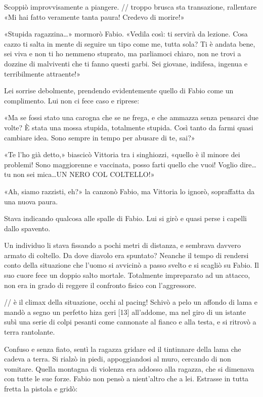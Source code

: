 Scoppiò improvvisamente a piangere.
// troppo brusca sta transazione, rallentare
«Mi hai fatto veramente tanta paura! Credevo di morire!»

«Stupida ragazzina\ldots» mormorò Fabio. «Vedila così: ti servirà da lezione. Cosa cazzo ti salta in mente di seguire un tipo come me, tutta sola? Ti è andata bene, sei viva e non ti ho nemmeno stuprato, ma parliamoci chiaro, non ne trovi a dozzine di malviventi che ti fanno questi garbi. Sei giovane, indifesa, ingenua e terribilmente attraente!»

Lei sorrise debolmente, prendendo evidentemente quello di Fabio come un complimento. Lui non ci fece caso e riprese:

«Ma se fossi stato una carogna che se ne frega, e che ammazza senza pensarci due volte? È stata una mossa stupida, totalmente stupida. Così tanto da farmi quasi cambiare idea. Sono sempre in tempo per abusare di te, sai?»

«Te l'ho già detto,» biascicò Vittoria tra i singhiozzi, «quello è il minore dei problemi! Sono maggiorenne e vaccinata, posso farti quello che vuoi! Voglio dire\ldots tu non sei mica\ldots UN NERO COL COLTELLO!»

«Ah, siamo razzisti, eh?» la canzonò Fabio, ma Vittoria lo ignorò, sopraffatta da una nuova paura.

Stava indicando qualcosa alle spalle di Fabio. Lui si girò e quasi perse i capelli dallo spavento.

Un individuo li stava fissando a pochi metri di distanza, e sembrava davvero armato di coltello. Da dove diavolo era spuntato? Neanche il tempo di rendersi conto della situazione che l'uomo si avvicinò a passo svelto e si scagliò su Fabio. Il suo cuore fece un doppio salto mortale. Totalmente impreparato ad un attacco, non era in grado di reggere il confronto fisico con l'aggressore.

// è il climax della situazione, occhi al pacing!
Schivò a pelo un affondo di lama e mandò a segno un perfetto hiza geri [13] all'addome, ma nel giro di un istante subì una serie di colpi pesanti come cannonate al fianco e alla testa, e si ritrovò a terra rantolante.

Confuso e senza fiato, sentì la ragazza gridare ed il tintinnare della lama che cadeva a terra. Si rialzò in piedi, appoggiandosi al muro, cercando di non vomitare. Quella montagna di violenza era addosso alla ragazza, che si dimenava con tutte le sue forze. Fabio non pensò a nient'altro che a lei. Estrasse in tutta fretta la pistola e gridò:

